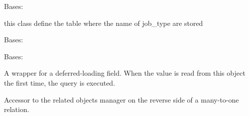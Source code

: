 \documentclass[letterpaper,10pt,english]{sphinxmanual}
\begin{document}
\begin{fulllineitems}
\label{\detokenize{QuChemPedIA.models:QuChemPedIA.models.JobTypeModel.JobType}}
Bases: 

this class define the table where the name of job\_type are stored

\begin{fulllineitems}
\label{\detokenize{QuChemPedIA.models:QuChemPedIA.models.JobTypeModel.JobType.DoesNotExist}}
Bases: 

\end{fulllineitems}


\begin{fulllineitems}
\label{\detokenize{QuChemPedIA.models:QuChemPedIA.models.JobTypeModel.JobType.MultipleObjectsReturned}}
Bases: 

\end{fulllineitems}


\begin{fulllineitems}
\label{\detokenize{QuChemPedIA.models:QuChemPedIA.models.JobTypeModel.JobType.id_job_type}}
A wrapper for a deferred-loading field. When the value is read from this
object the first time, the query is executed.

\end{fulllineitems}


\begin{fulllineitems}
\label{\detokenize{QuChemPedIA.models:QuChemPedIA.models.JobTypeModel.JobType.importfile_set}}
Accessor to the related objects manager on the reverse side of a
many-to-one relation.


\end{fulllineitems}
\end{fulllineitems}
\end{document}
